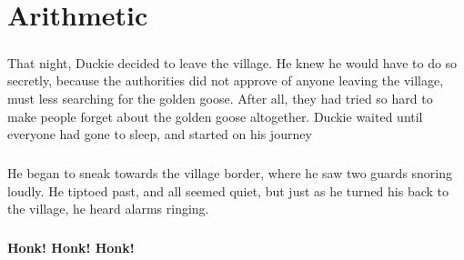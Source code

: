 \documentclass[a4paper,11pt ]{book}
\begin{document}
\chapter{Arithmetic}
\paragraph{} That night, Duckie decided to leave the village. He knew he would have to do so secretly, because the authorities did not approve of anyone leaving the village, must less searching for the golden goose. After all, they had tried so hard to make people forget about the golden goose altogether. Duckie waited until everyone had gone to sleep, and started on his journey
\paragraph{} He began to sneak towards the village border, where he saw two guards snoring loudly. He tiptoed past, and all seemed quiet, but just as he turned his back to the village, he heard alarms ringing. 
\paragraph{} \textbf{Honk! Honk! Honk!}
\end{document}
